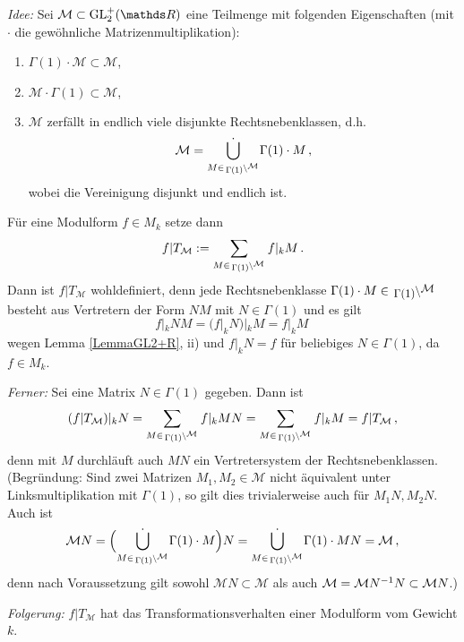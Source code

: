 \emph{Idee:} Sei $\mathcal{M} \subset \GL_2^+(\RR)$ eine Teilmenge mit folgenden Eigenschaften (mit $\cdot$ die gewöhnliche Matrizenmultiplikation): \begin{enumerate}
\item $\Gamma (1) \cdot \mathcal M \subset \mathcal M$,
\item $\mathcal M \cdot \Gamma(1) \subset \mathcal M$,
\item $\mathcal M$ zerfällt in endlich viele disjunkte Rechtsnebenklassen, d.h.
\[
\mathcal M = \dot{\bigcup_{M \in \linksmodulo{\Gamma(1)}{\mathcal M}}} \Gamma(1) \cdot M
\,,
\]
wobei die Vereinigung disjunkt und endlich ist. 
\end{enumerate}
Für eine Modulform $f \in M_k$ setze dann
\[
f | T_{\mathcal M} := \sum_{M \in \linksmodulo{\Gamma(1)}{\mathcal M}} f|_k M
\,.
\]
Dann ist $f | T_{\mathcal M}$ wohldefiniert, denn jede Rechtsnebenklasse $\Gamma (1) \cdot M \in \linksmodulo{\Gamma(1)}{\mathcal M}$ besteht aus Vertretern der Form $N M$ mit $N \in \Gamma (1)$ und es gilt
\[
f |_k N M = (f |_k N) |_k M = f |_k M
\,
\]
wegen Lemma \ref{LemmaGL2+R}, ii) und $f |_k N = f$ für beliebiges $N \in \Gamma (1)$, da $f \in M_k$.

\emph{Ferner:} Sei eine Matrix $N \in \Gamma(1)$ gegeben. Dann ist 
\[
(f | T_{\mathcal M}) |_k N = \sum_{M \in \linksmodulo{\Gamma(1)}{\mathcal M}} f |_k M N = \sum_{M \in \linksmodulo{\Gamma(1)}{\mathcal M}} f |_k M = f | T_{\mathcal M}
\,,
\]
denn mit $M$ durchläuft auch $MN$ ein Vertretersystem der Rechtsnebenklassen. (Begründung: Sind zwei Matrizen $M_1, M_2 \in \mathcal M$ nicht äquivalent unter Linksmultiplikation mit $\Gamma(1)$, so gilt dies trivialerweise auch für $M_1N, M_2N$. Auch ist
\[
\mathcal M N = \Bigl( \dot{\bigcup_{M \in \linksmodulo{\Gamma(1)}{\mathcal M}}} \Gamma(1) \cdot M \Bigr) N = \dot{\bigcup_{M \in \linksmodulo{\Gamma(1)}{\mathcal M}}} \Gamma(1) \cdot M N = \mathcal M
\,,
\]
denn nach Voraussetzung gilt sowohl $\mathcal M N \subset \mathcal M$ als auch $\mathcal M = \mathcal M N^{-1}N \subset \mathcal M N$.)

\emph{Folgerung:} $f | T_{\mathcal M}$ hat das Transformationsverhalten einer Modulform vom Gewicht $k$.
